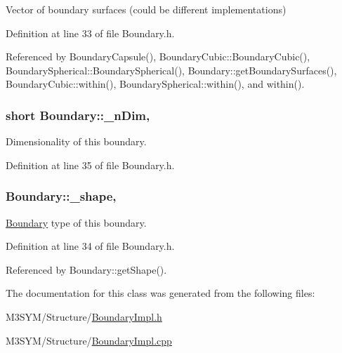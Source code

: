 Vector of boundary surfaces (could be different implementations) 



Definition at line 33 of file Boundary.\+h.



Referenced by Boundary\+Capsule(), Boundary\+Cubic\+::\+Boundary\+Cubic(), Boundary\+Spherical\+::\+Boundary\+Spherical(), Boundary\+::get\+Boundary\+Surfaces(), Boundary\+Cubic\+::within(), Boundary\+Spherical\+::within(), and within().

\hypertarget{classBoundary_a96f2294e0c822ab216fe5ab7e17258c7}{
\subsubsection[{\+\_\+n\+Dim}]{\setlength{\rightskip}{0pt plus 5cm}short Boundary\+::\+\_\+n\+Dim\hspace{0.3cm}{\ttfamily [protected]}, {\ttfamily [inherited]}}}\label{classBoundary_a96f2294e0c822ab216fe5ab7e17258c7}


Dimensionality of this boundary. 



Definition at line 35 of file Boundary.\+h.

\hypertarget{classBoundary_a04c10c9a7aea1924d779d392e29f94ff}{
\subsubsection[{\+\_\+shape}]{ Boundary\+::\+\_\+shape\hspace{0.3cm}{\ttfamily [protected]}, {\ttfamily [inherited]}}}\label{classBoundary_a04c10c9a7aea1924d779d392e29f94ff}


\hyperlink{classBoundary}{Boundary} type of this boundary. 



Definition at line 34 of file Boundary.\+h.



Referenced by Boundary\+::get\+Shape().



The documentation for this class was generated from the following files\+:\begin{DoxyCompactItemize}
\item 
M3\+S\+Y\+M/\+Structure/\hyperlink{BoundaryImpl_8h}{Boundary\+Impl.\+h}\item 
M3\+S\+Y\+M/\+Structure/\hyperlink{BoundaryImpl_8cpp}{Boundary\+Impl.\+cpp}\end{DoxyCompactItemize}
